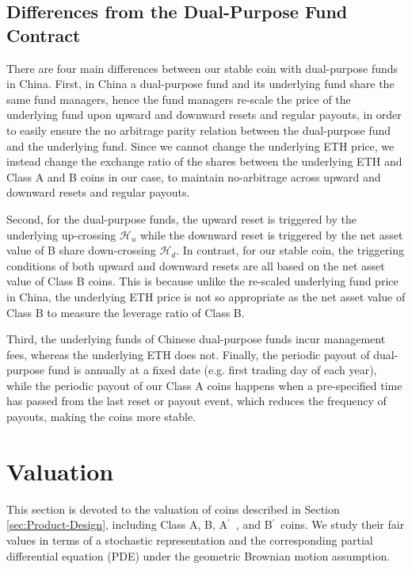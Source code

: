 \documentclass[11pt]{article}%
\numberwithin{equation}{section}
\theoremstyle{plain}
\newcommand{\Ap}{A\ensuremath{^\prime}~}
\newcommand{\Bp}{B\ensuremath{^\prime}~}
\begin{document}
\subsection{Differences from the Dual-Purpose Fund Contract}

There are four main differences between our stable coin with dual-purpose funds in China. First, in China a dual-purpose fund and its underlying fund share the same fund managers, hence the fund managers re-scale the price of the underlying fund upon upward and downward resets and regular payouts, in order to easily ensure the no arbitrage parity relation between the dual-purpose fund and the underlying fund. Since we cannot change the underlying ETH price, we instead change the exchange ratio of the shares between the underlying ETH and Class A and B coins in our case, to maintain no-arbitrage across upward and downward resets and regular payouts.

 Second, for the dual-purpose funds, the upward reset is triggered by the underlying up-crossing $\mathcal{H}_u$ while the downward reset is triggered by the net asset value of B share down-crossing $\mathcal{H}_d$. In contrast, for our stable coin, the triggering conditions of both upward and downward resets are all based on the net asset value of Class B coins. This is because unlike the re-scaled underlying fund price in China, the underlying ETH price is not so appropriate as the net asset value of Class B to measure the leverage ratio of Class B.

 Third, the underlying funds of Chinese dual-purpose funds incur management fees, whereas the underlying ETH does not. Finally, the periodic payout of dual-purpose fund is annually at a fixed date (e.g. first trading day of each year), while the periodic payout of our Class A coins happens when a pre-specified time has passed from the last reset or payout event, which reduces the frequency of payouts, making the coins more stable.



\section{Valuation}\label{sect:valuation}

This section is devoted to the valuation of coins described in Section \ref{sec:Product-Design}, including Class A, B, \Ap, and \Bp coins. We study their fair values in terms of a stochastic representation and the corresponding partial differential equation (PDE) under the geometric Brownian motion assumption.
\end{document}
